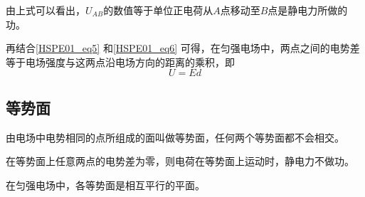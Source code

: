 由上式可以看出，$U_{AB}$的数值等于单位正电荷从$A$点移动至$B$点是静电力所做的功。

再结合\autoref{HSPE01_eq5} 和\autoref{HSPE01_eq6} 可得，在匀强电场中，两点之间的电势差等于电场强度与这两点沿电场方向的距离的乘积，即
\begin{equation}
U=Ed
\end{equation}

\subsection{等势面}

由电场中电势相同的点所组成的面叫做等势面，任何两个等势面都不会相交。

在等势面上任意两点的电势差为零，则电荷在等势面上运动时，静电力不做功。

在匀强电场中，各等势面是相互平行的平面。
